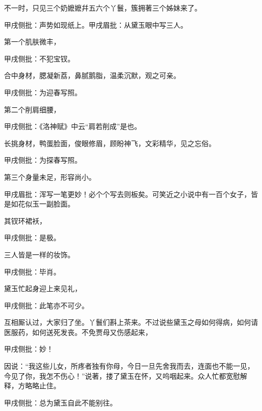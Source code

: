 \begin{parag}
    不一时，只见三个奶嬷嬷幷五六个丫鬟，簇拥著三个姊妹来了。\begin{note}甲戌侧批：声势如现纸上。甲戌眉批：从黛玉眼中写三人。\end{note}第一个肌肤微丰，\begin{note}甲戌侧批：不犯宝钗。\end{note}合中身材，腮凝新荔，鼻腻鹅脂，温柔沉默，观之可亲。\begin{note}甲戌侧批：为迎春写照。\end{note}第二个削肩细腰，\begin{note}甲戌侧批：《洛神赋》中云“肩若削成”是也。\end{note}长挑身材，鸭蛋脸面，俊眼修眉，顾盼神飞，文彩精华，见之忘俗。\begin{note}甲戌侧批：为探春写照。\end{note}第三个身量未足，形容尚小。\begin{note}甲戌眉批：浑写一笔更妙！必个个写去则板矣。可笑近之小说中有一百个女子，皆是如花似玉一副脸面。\end{note}其钗环裙袄，\begin{note}甲戌侧批：是极。\end{note}三人皆是一样的妆饰。\begin{note}甲戌侧批：毕肖。\end{note}黛玉忙起身迎上来见礼，\begin{note}甲戌侧批：此笔亦不可少。\end{note}互相厮认过，大家归了坐。丫鬟们斟上茶来。不过说些黛玉之母如何得病，如何请医服药，如何送死发丧。不免贾母又伤感起来，\begin{note}甲戌侧批：妙！\end{note}因说：“我这些儿女，所疼者独有你母，今日一旦先舍我而去，连面也不能一见，今见了你，我怎不伤心！”说著，搂了黛玉在怀，又呜咽起来。众人忙都宽慰解释，方略略止住。\begin{note}甲戌侧批：总为黛玉自此不能别往。\end{note}
\end{parag}


